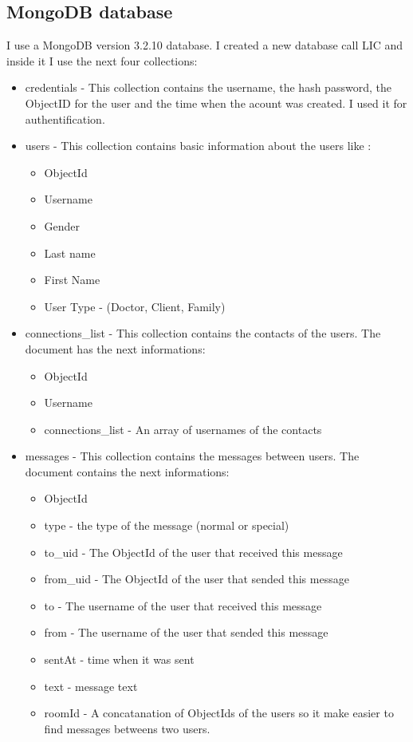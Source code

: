 \subsection{MongoDB database}
\label{sub-sec:implementation-callapp-mongo}
I use a MongoDB version 3.2.10 database. I created a new database call LIC and inside it I use the next four collections:
\begin{itemize}
    \item credentials - This collection contains the username, the hash password, the ObjectID for the user and the time when
    the acount was created. I used it for authentification.
    \item users - This collection contains basic information about the users like : 
        \begin{itemize}
            \item ObjectId
            \item Username
            \item Gender
            \item Last name
            \item First Name
            \item User Type - (Doctor, Client, Family)
        \end{itemize}
    \item connections_list - This collection contains the contacts of the users. The document has the next informations:
        \begin{itemize}
            \item ObjectId
            \item Username
            \item connections_list - An array of usernames of the contacts
        \end{itemize}
    \item messages - This collection contains the messages between users. The document contains the next informations:
        \begin{itemize}
            \item ObjectId
            \item type - the type of the message (normal or special)
            \item to_uid - The ObjectId of the user that received this message
            \item from_uid - The ObjectId of the user that sended this message
            \item to - The username of the user that received this message
            \item from - The username of the user that sended this message
            \item sentAt - time when it was sent
            \item text - message text
            \item roomId - A concatanation of ObjectIds of the users so it make easier to find messages betweens two users.
        \end{itemize}
\end{itemize}
